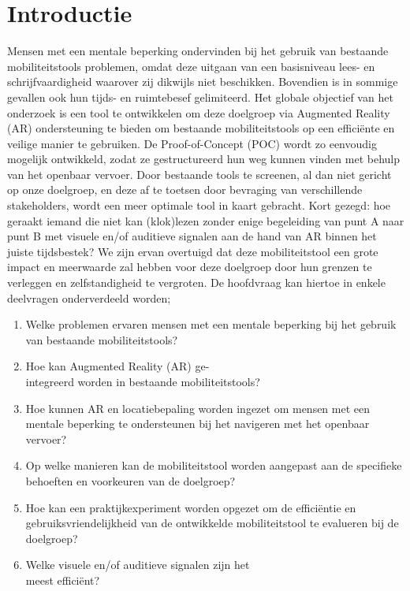 
\section{Introductie}%
\label{sec:introductie}

    Mensen met een mentale beperking ondervinden bij het gebruik van bestaande mobiliteits\-tools problemen, omdat deze uitgaan van een basisniveau lees- en schrijfvaardigheid waarover zij dikwijls niet beschikken. 
    Bovendien is in sommige gevallen ook hun tijds- en ruimtebesef gelimiteerd. 
    Het globale objectief van het onderzoek is een tool te ontwikkelen om deze doelgroep via Augmented Reality (AR) ondersteuning te bieden om bestaande mobiliteitstools op een efficiënte en veilige manier te gebruiken.
    De Proof-of-Concept (POC) wordt zo eenvoudig mogelijk ontwikkeld, zodat ze gestructureerd hun weg kunnen vinden met behulp van het openbaar vervoer. 
    Door bestaande tools te screenen, al dan niet gericht op onze doelgroep, en deze af te toetsen door bevraging van verschillende stakeholders, wordt een meer optimale tool in kaart gebracht. 
    Kort gezegd: hoe geraakt iemand die niet kan (klok)lezen zonder enige begeleiding van punt A naar punt B met visuele en/of auditieve signalen aan de hand van AR binnen het juiste tijdsbestek? We zijn ervan overtuigd dat deze mobiliteitstool een grote impact en meerwaarde zal hebben voor deze doelgroep door hun grenzen te verleggen en zelfstandigheid te vergroten. De hoofdvraag kan hiertoe in enkele deelvragen onderverdeeld worden;
    
    \begin{enumerate}
        \item Welke problemen ervaren mensen met een mentale beperking bij het gebruik van bestaande mobiliteitstools?
        \item Hoe kan Augmented Reality (AR) ge-\\integreerd worden in bestaande mobiliteits\-tools?
        \item Hoe kunnen AR en locatiebepaling worden ingezet om mensen met een mentale beperking te ondersteunen bij het navigeren met het openbaar vervoer?
        \item Op welke manieren kan de mobiliteitstool worden aangepast aan de specifieke behoeften en voorkeuren van de doelgroep?
        \item Hoe kan een praktijkexperiment worden opgezet om de efficiëntie en gebruiksvriendelijkheid van de ontwikkelde mobiliteitstool te evalueren bij de doelgroep?
        \item Welke visuele en/of auditieve signalen zijn het \\meest efficiënt?
    \end{enumerate}

